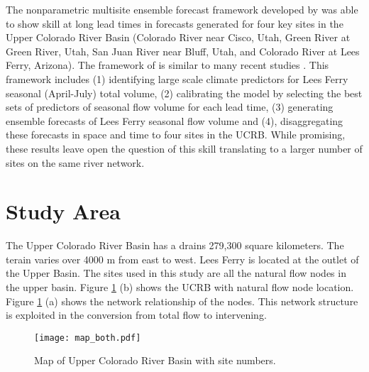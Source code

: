 \documentclass[11pt]{article}
\begin{document}
The nonparametric multisite ensemble forecast framework developed by \cite{Bracken:2010p2682} was able to show skill at long lead times in forecasts generated for four key sites in the Upper Colorado River Basin (Colorado River near Cisco, Utah, Green River at Green River, Utah, San Juan River near Bluff, Utah, and Colorado River at Lees Ferry, Arizona).  The framework of \cite{Bracken:2010p2682} is similar to many recent studies \citep{Moradkhani:2010p3069,Opitz-Stapleton2007,Regonda2006,Grantz:2005p115}. This framework includes (1) identifying large scale climate predictors for Lees Ferry seasonal (April-July) total volume, (2) calibrating the model by selecting the best sets of predictors of seasonal flow volume for each lead time, (3) generating ensemble forecasts of Lees Ferry seasonal flow volume and (4), disaggregating these forecasts in space and time to four sites in the UCRB.  While promising, these results leave open the question of this skill translating to a larger number of sites on the same river network. 


\section{Study Area}
The Upper Colorado River Basin has a drains 279,300 square kilometers.  The terain varies over 4000 m from east to west. Lees Ferry is located at the outlet of the Upper Basin.  The sites used in this study are all the natural flow nodes in the upper basin.  Figure \ref{fig:map} (b) shows the UCRB with natural flow node location. Figure \ref{fig:map} (a) shows the network relationship of the nodes.  This network structure is exploited in the conversion from total flow to intervening. 

\begin{figure}[htbp] %
   \centering
   \texttt{[image: map\_both.pdf]} 
   \caption{Map of Upper Colorado River Basin with site numbers.}
   \label{fig:map}
\end{figure}
\end{document}
